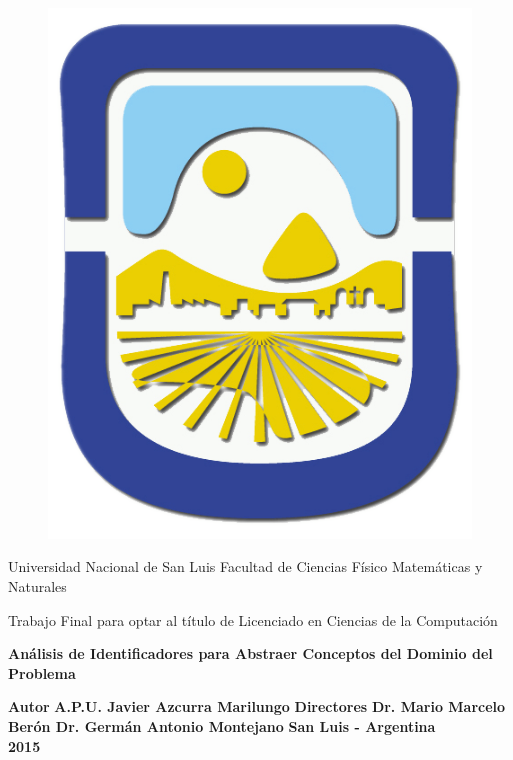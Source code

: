 \enlargethispage{\baselineskip}%
\enlargethispage{\baselineskip}
\enlargethispage{\baselineskip}

\begin{titlepage}

{\bfseries\LARGE\centering

\begin{figure}[h!]
\centerline{%
\includegraphics[scale= 0.15]{./init/unsl_logo.png}} 
\end{figure}  

Universidad Nacional de San Luis
\vskip0.5cm
Facultad de Ciencias Físico Matemáticas y Naturales

}
\vskip1cm  
{\bfseries\normalsize\centering

Trabajo Final para optar al título de Licenciado en Ciencias de la Computación
\vskip0.5cm
}

    \centering
    {\bfseries\LARGE         
	Análisis de Identificadores para Abstraer Conceptos del	Dominio del Problema
     \vskip0.8cm       
   }

 {\bfseries\large
	Autor
	\vskip0.1cm   
   }
   {\bfseries\Large
A.P.U. Javier Azcurra Marilungo
   \vskip0.8cm
   }
   {\bfseries\large
	Directores
	\vskip0.1cm   
   }
   {\bfseries\Large
Dr. Mario Marcelo Berón
\vskip0.5cm
Dr. Germán Antonio Montejano
   \vskip1.4cm
}
{\bfseries\normalsize   
   San Luis - Argentina\\
   2015
   }
  

\end{titlepage}
 
